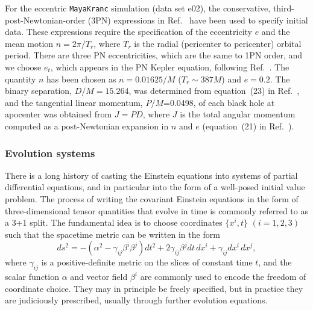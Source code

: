 For the eccentric {\tt MayaKranc} simulation (data set e02), the
conservative, third-post-Newtonian-order (3PN) expressions in
Ref.~\cite{Konigsdorffer:2006zt} have been used to specify initial
data.  These expressions require the specification of the eccentricity
$e$ and the mean motion $n = 2\pi/T_r$, where $T_r$ is the radial
(pericenter to pericenter) orbital period.  There are three PN
eccentricities, which are the same to 1PN order, and we choose $e_t$,
which appears in the PN Kepler equation, following
Ref.~\cite{Konigsdorffer:2006zt}.  The quantity $n$ has been chosen as
$n = 0.01625/M$ ($T_r \sim 387 M$) and $e=0.2$.  The binary
separation, $D/M=15.264$, was determined from equation~(23) in
Ref.~\cite{Konigsdorffer:2006zt}, and the tangential linear momentum,
$P/M$=0.0498, of each black hole at apocenter was obtained from $J = P
D$, where $J$ is the total angular momentum computed as a
post-Newtonian expansion in $n$ and $e$ (equation~(21) in
Ref.~\cite{Konigsdorffer:2006zt}).




\subsubsection{Evolution systems}
\label{ssec:ev}

There is a long history of casting the Einstein equations into systems
of partial differential equations, and in 
particular into the form of a well-posed initial value problem. The
process of writing the covariant Einstein equations 
in the form of three-dimensional tensor quantities that evolve in time
is commonly referred to as a 3+1 split. The fundamental idea
is to choose coordinates $\{x^{i},t\}$ $(i=1,2,3)$ such 
that the spacetime metric can be written in the form
\begin{equation}
\label{3+1_split}
ds^2 = -(\alpha^{2}-\gamma_{ij}\beta^{i}\beta^{j})dt^{2}
   + 2 \gamma_{ij}\beta^{j}dt\,dx^{i}
   + \gamma_{ij}dx^{i}\,dx^{j}, 
\end{equation}
where $\gamma_{ij}$ is a positive-definite metric on the slices of
constant time $t$, and the scalar function $\alpha$ and  
vector field $\beta^i$ are commonly used to encode the freedom of
coordinate choice. They may in principle be freely specified, but in
practice they are judiciously prescribed, usually through further evolution equations.

